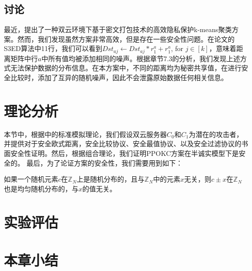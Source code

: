 \subsection{讨论}
最近，\cite{wu2020secure}提出了一种双云环境下基于密文打包技术的高效隐私保护k-means聚类方案。然而，我们发现虽然方案非常高效，但是存在一些安全性问题。在论文\cite{wu2020secure}的S3ED算法中11行，我们可以看到$D s t_{a j} \leftarrow D s t_{a j} * r_1^a+r_1^a$, for $j \in[k]$，意味着距离矩阵中行$ a $中所有值均被添加相同的噪声。根据\cite{liu2019toward}章节7.3的分析，我们发现上述方式无法保护数据的分布信息。在本方案中，不同的距离均为秘密共享值，在进行安全比较时，添加了互异的随机噪声，因此不会泄露原始数据任何相关信息。
\section{理论分析}
\label{s3-lilun}
本节中，根据\cite{goldreich2004encryption}中的标准模拟理论，我们假设双云服务器$ C_0$和$ C_1$为潜在的攻击者，并提供对于安全欧式距离，安全比较协议、安全最值协议、以及安全过滤协议的书面安全性证明。然后，根据组合理论，我们证明PPOKC方案在半诚实模型下是安全的。 最后，为了论证方案的安全性，我们需要用到如下：



\begin{lemma}
如果一个随机元素$ c $在$ \mathbb{Z}_N $上是随机分布的，且与$ \mathbb{Z}_N $中的元素$ x $无关，则$ c\pm x$在$ \mathbb{Z}_N $也是均匀随机分布的，与$ x $的值无关。
\end{lemma}
	
\section{实验评估}
\label{s3-shiyan}
\section{本章小结}
\label{s3-xiaojie}